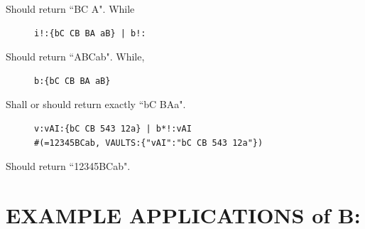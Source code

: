 \documentclass[a4paper, 18pt]{book} %
\begin{document}
Should return ``BC A". While  


 \begin{figure}[H]
 \Large
  \centering
  \begin{tcolorbox}[teaterminalstyle, title=TEA Program: computing LEXICAL Base of AI]
  \begin{lstlisting}[language=TEA]
i!:{bC CB BA aB} | b!:
   \end{lstlisting}
  \end{tcolorbox}
\end{figure}

Should return ``ABCab". While,  


 \begin{figure}[H]
 \Large
  \centering
  \begin{tcolorbox}[teaterminalstyle, title=TEA Program: compute FIFO Base of a literal string]
  \begin{lstlisting}[language=TEA]
b:{bC CB BA aB}
   \end{lstlisting}
  \end{tcolorbox}
\end{figure}


Shall or should return exactly ``bC BAa".

 \begin{figure}[H]
 \Large
  \centering
  \begin{tcolorbox}[teaterminalstyle, title=TEA Program: computing LEXICAL Base of data in a vault]
  \begin{lstlisting}[language=TEA]
v:vAI:{bC CB 543 12a} | b*!:vAI 
#(=12345BCab, VAULTS:{"vAI":"bC CB 543 12a"})
   \end{lstlisting}
  \end{tcolorbox}
\end{figure}

Should return ``12345BCab". 


\section{EXAMPLE APPLICATIONS of B:}
\label{SECEXAMPB}
\end{document}
